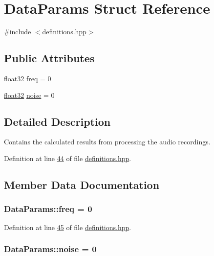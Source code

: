 \hypertarget{structDataParams}{\section{Data\+Params Struct Reference}
\label{structDataParams}
}


{\ttfamily \#include $<$definitions.\+hpp$>$}

\subsection*{Public Attributes}
\begin{DoxyCompactItemize}
\item 
\hyperlink{definitions_8hpp_aacdc525d6f7bddb3ae95d5c311bd06a1}{float32} \hyperlink{structDataParams_a12566e017407647bc8287d62554ad3fb}{freq} = 0
\item 
\hyperlink{definitions_8hpp_aacdc525d6f7bddb3ae95d5c311bd06a1}{float32} \hyperlink{structDataParams_a4efd1d2231c6fa7c878c9d5e1650738f}{noise} = 0
\end{DoxyCompactItemize}


\subsection{Detailed Description}
Contains the calculated results from processing the audio recordings. 

Definition at line \hyperlink{definitions_8hpp_source_l00044}{44} of file \hyperlink{definitions_8hpp_source}{definitions.\+hpp}.



\subsection{Member Data Documentation}
\hypertarget{structDataParams_a12566e017407647bc8287d62554ad3fb}{
\subsubsection[{freq}]{ Data\+Params\+::freq = 0}}\label{structDataParams_a12566e017407647bc8287d62554ad3fb}


Definition at line \hyperlink{definitions_8hpp_source_l00045}{45} of file \hyperlink{definitions_8hpp_source}{definitions.\+hpp}.

\hypertarget{structDataParams_a4efd1d2231c6fa7c878c9d5e1650738f}{
\subsubsection[{noise}]{ Data\+Params\+::noise = 0}}\label{structDataParams_a4efd1d2231c6fa7c878c9d5e1650738f}


